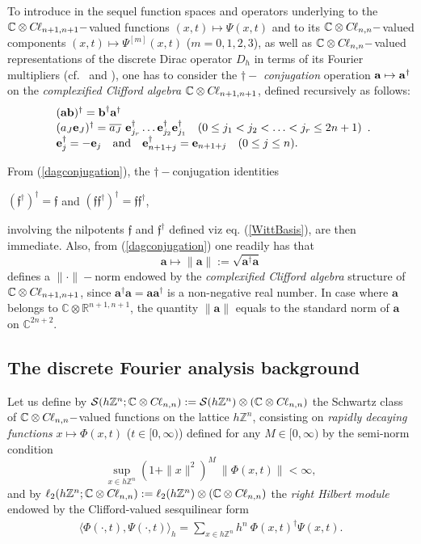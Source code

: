 \documentclass{elsarticle}
\newcommand{\BR}{{\mathbb R}}
\newcommand{\BC}{{\mathbb C}}
\newcommand{\BZ}{{\mathbb Z}}
\newcommand{\e}{{\bf e}}
\renewcommand{\a}{\textbf{a}}
\renewcommand{\b}{\textbf{b}}
\newcommand{\f}{{\mathfrak f}}
\newcommand{\cl}{C \kern -0.1em \ell}
\begin{document}
To introduce in the sequel function spaces and operators underlying to the $\BC \otimes \cl_{n+1,n+1}-$valued functions $(x,t)\mapsto \Psi(x,t)$ and to its $\BC\otimes\cl_{n,n}-$valued components $(x,t)\mapsto\Psi^{[m]}(x,t)$ ($m=0,1,2,3$), as well as $\BC\otimes\cl_{n,n}-$valued representations of the discrete Dirac operator $D_h$ in terms of its Fourier multipliers (cf.~\cite[Subsection 21.2.2]{F19} and \cite[Subsection 2.3]{F20}), one 
has to consider the $\dag-${\it
	conjugation} operation ${\bf a} \mapsto{\bf a}^\dag$ on the \textit{complexified Clifford algebra} $\BC\otimes\cl_{n+1,n+1}$, defined recursively as follows: 
\begin{eqnarray}
	\label{dagconjugation}
	\begin{array}{lll}
		(\a \b)^\dag=\b^\dag\a^\dag \\ (a_J \e_J)^\dag =\overline{a_J}~\e_{j_r}^\dag
		\ldots \e_{j_2}^\dag\e_{j_1}^\dag~~~(0\leq j_1<j_2<\ldots<j_r\leq 2n+1) \\
		\e_j^\dag=-\e_j~~~\mbox{and}~~~\e_{n+1+j}^\dag=\e_{n+1+j}~~~(0\leq j\leq
		n).
	\end{array}.
\end{eqnarray}

From (\ref{dagconjugation}), the $\dagger-$conjugation identities
\begin{center}
	$(\f^\dag)^\dag=\f$ and $(\f \f^\dagger)^\dagger=\f \f^\dagger$,
\end{center}
involving the nilpotents $\f$ and $\f^\dagger$ defined viz eq. (\ref{WittBasis}), are then immediate. Also, from (\ref{dagconjugation}) one readily has that $$\a\mapsto \| \a\|:=\sqrt{\a^\dagger \a}$$
defines a $\|\cdot \|-$norm endowed by the \textit{complexified Clifford algebra} structure of $\BC\otimes \cl_{n+1,n+1}$, since $\a^\dag\a=\a\a^\dag$ is a non-negative real number. In case where $\a$ belongs to $\BC\otimes \BR^{n+1,n+1}$, the quantity $\|\a\|$ equals to the standard norm of $\a$ on $\BC^{2n+2}$.


\subsection{The discrete Fourier analysis background}

Let us define by $\mathcal{S}(h\BZ^n;\BC\otimes \cl_{n,n}):=\mathcal{S}(h\BZ^n)\otimes \left(\BC\otimes \cl_{n,n}\right)$ the Schwartz class of $\BC\otimes\cl_{n,n}-$valued functions on the lattice $h\BZ^n$, consisting on \textit{rapidly decaying functions} $x\mapsto \varPhi(x,t)$ ($t \in [0,\infty)$) defined for any $M\in [0,\infty)$ by the semi-norm condition
$$ \displaystyle \sup_{x \in h\BZ^n} (1+\| x\|^2)^M~\| \varPhi(x,t)\|<\infty,$$
and by $\ell_2(h\BZ^n;\BC\otimes \cl_{n,n}):=\ell_2(h\BZ^n)\otimes \left(\BC\otimes \cl_{n,n}\right)$ the \textit{right Hilbert module} endowed by the Clifford-valued sesquilinear form 
\begin{eqnarray}
	\label{lpInner} \langle \varPhi(\cdot,t),\varPsi(\cdot,t) \rangle_{h}=\sum_{x\in h\BZ^n}h^n~
	\varPhi(x,t)^\dag\varPsi(x,t).
\end{eqnarray}
\end{document}
